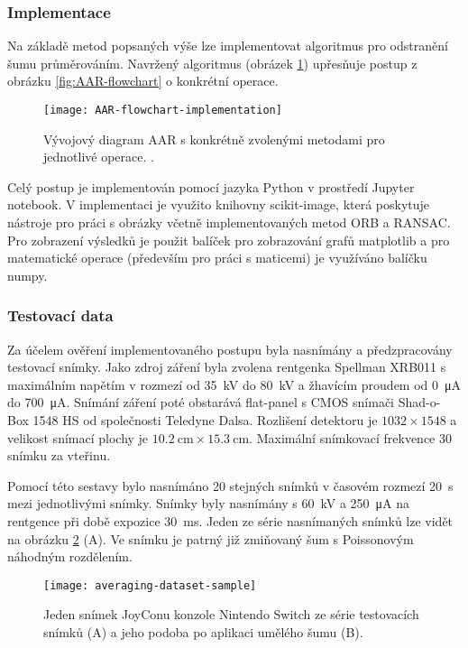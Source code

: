 \subsubsection{Implementace}
Na základě metod popsaných výše lze implementovat algoritmus pro odstranění šumu průměrováním. Navržený algoritmus (obrázek \ref{fig:AAR-flowchart-implementation}) upřesňuje postup z obrázku \ref{fig:AAR-flowchart} o konkrétní operace.

\begin{figure}[!htb]
\centering
\texttt{[image: AAR-flowchart-implementation]}
\caption{Vývojový diagram AAR s konkrétně zvolenými metodami pro jednotlivé operace. .}
\label{fig:AAR-flowchart-implementation}
\end{figure}

Celý postup je implementován pomocí jazyka Python v prostředí Jupyter notebook. V implementaci je využito knihovny scikit-image, která poskytuje nástroje pro práci s obrázky včetně implementovaných metod ORB a RANSAC. Pro zobrazení výsledků je použit balíček pro zobrazování grafů matplotlib a pro matematické operace (především pro práci s maticemi) je využíváno balíčku numpy.

\subsubsection{Testovací data}
Za účelem ověření implementovaného postupu byla nasnímány a předzpracovány testovací snímky. Jako zdroj záření byla zvolena rentgenka Spellman XRB011 \cite{spellman-xrb011} s maximálním napětím v rozmezí od \SI{35}{\kV} do \SI{80}{\kV} a žhavícím proudem od \SI{0}{\micro\ampere} do \SI{700}{\micro\ampere}. Snímání záření poté obstarává flat-panel s CMOS snímači Shad-o-Box 1548 HS \cite{SB1548HS} od společnosti Teledyne Dalsa. Rozlišení detektoru je $1032 \times 1548$ a velikost snímací plochy je $\SI{10.2}{\cm} \times \SI{15.3}{\cm}$. Maximální snímkovací frekvence 30 snímku za vteřinu.

Pomocí této sestavy bylo nasnímáno 20 stejných snímků v časovém rozmezí \SI{20}{\second} mezi jednotlivými snímky. Snímky byly nasnímány s \SI{60}{\kV} a \SI{250}{\micro\ampere} na rentgence při době expozice \SI{30}{\ms}. Jeden ze série nasnímaných snímků lze vidět na obrázku \ref{fig:averaging-dataset-sample} (A). Ve snímku je patrný již zmiňovaný šum s Poissonovým náhodným rozdělením. 

\begin{figure}[htb]
\centering
\texttt{[image: averaging-dataset-sample]}
\caption{Jeden snímek JoyConu konzole Nintendo Switch ze série testovacích snímků (A) a jeho podoba po aplikaci umělého šumu (B).}
\label{fig:averaging-dataset-sample}
\end{figure}

